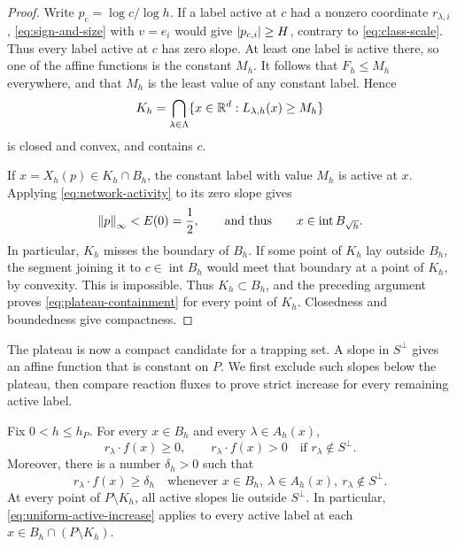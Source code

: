\begin{proof}
Write $p_c=\log c/\log h$.  If a label active at $c$ had a nonzero
coordinate $r_{\lambda,i}$, \eqref{eq:sign-and-size} with $v=e_i$ would
give $\left|p_{c,i}\right|\geq H$, contrary to \eqref{eq:class-scale}.
Thus every label active at $c$ has zero slope.  At least one label is
active there, so one of the affine functions is the constant $M_h$.
It follows that $F_h\leq M_h$ everywhere, and that $M_h$ is the least
value of any constant label.  Hence
\[
 K_h=\bigcap_{\lambda\in\Lambda}
       \{x\in\mathbb R^d:L_{\lambda,h}(x)\geq M_h\}
\]
is closed and convex, and contains $c$.

If $x=X_h(p)\in K_h\cap B_h$, the constant label with value $M_h$ is
active at $x$.  Applying \eqref{eq:network-activity} to its zero slope
gives
\[
 \left\|p\right\|_\infty<E(0)=\frac12,
 \qquad\text{and thus}\qquad
 x\in\operatorname{int}B_{\sqrt h}.
\]
In particular, $K_h$ misses the boundary of $B_h$.  If some point of
$K_h$ lay outside $B_h$, the segment joining it to
$c\in\operatorname{int}B_h$ would meet that boundary at a point of
$K_h$, by convexity.  This is impossible.  Thus $K_h\subset B_h$, and
the preceding argument proves \eqref{eq:plateau-containment} for every
point of $K_h$.  Closedness and boundedness give compactness.
\end{proof}

The plateau is now a compact candidate for a trapping set. A slope in
$S^\perp$ gives an affine function that is constant on $P$. We first
exclude such slopes below the plateau, then compare reaction fluxes to
prove strict increase for every remaining active label.

\begin{proposition}\label{prop:increase}
Fix $0<h\leq h_P$.  For every $x\in B_h$ and every
$\lambda\in A_h(x)$,
\begin{equation}\label{eq:active-flux-sign}
 r_\lambda\cdot f(x)\geq0,
 \qquad
 r_\lambda\cdot f(x)>0\quad\text{if }r_\lambda\notin S^\perp.
\end{equation}
Moreover, there is a number $\delta_h>0$ such that
\begin{equation}\label{eq:uniform-active-increase}
 r_\lambda\cdot f(x)\geq\delta_h
 \quad\text{whenever }x\in B_h,\ \lambda\in A_h(x),
                       \ r_\lambda\notin S^\perp.
\end{equation}
At every point of $P\setminus K_h$, all active slopes lie outside
$S^\perp$.  In particular, \eqref{eq:uniform-active-increase} applies
to every active label at each $x\in B_h\cap(P\setminus K_h)$.
\end{proposition}

